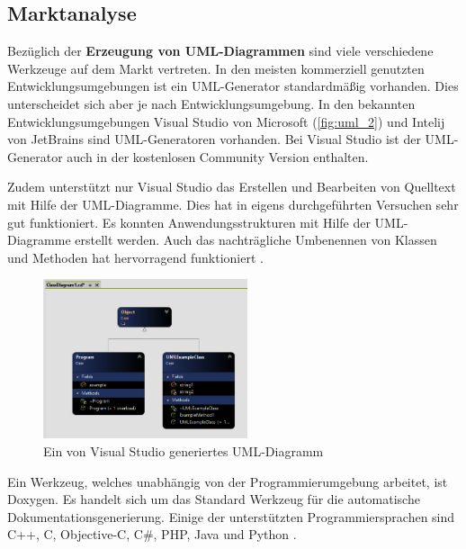 \subsection{Marktanalyse}
\label{subsubsec:diagramanalyses}
Bezüglich der \textbf{Erzeugung von UML-Diagrammen} sind viele verschiedene Werkzeuge auf dem Markt vertreten. In den meisten kommerziell genutzten Entwicklungsumgebungen ist ein UML-Generator standardmäßig vorhanden. Dies unterscheidet sich aber je nach Entwicklungsumgebung. In den bekannten Entwicklungsumgebungen Visual Studio von Microsoft (\autoref{fig:uml_2}) und Intelij von JetBrains sind UML-Generatoren vorhanden. Bei Visual Studio ist der UML-Generator auch in der kostenlosen Community Version enthalten. 

Zudem unterstützt nur Visual Studio das Erstellen und Bearbeiten von Quelltext mit Hilfe der UML-Diagramme. Dies hat in eigens durchgeführten Versuchen sehr gut funktioniert. Es konnten Anwendungsstrukturen mit Hilfe der UML-Diagramme erstellt werden. Auch das nachträgliche Umbenennen von Klassen und Methoden hat hervorragend funktioniert \cite{TerryG.Lee.2022}\cite{JetBrains.2022}.
\begin{figure}
	\centering
	\includegraphics[width=6cm]{images/uml_vs.png}
	\caption{Ein von Visual Studio generiertes UML-Diagramm}
	\label{fig:uml_2}
\end{figure}
\FloatBarrier
Ein Werkzeug, welches unabhängig von der Programmierumgebung arbeitet, ist Doxygen. Es handelt sich um das Standard Werkzeug für die automatische Dokumentationsgenerierung. Einige der unterstützten Programmiersprachen sind C++, C, Objective-C, C\#, PHP, Java und Python \cite{Doxygen.2022}. 

